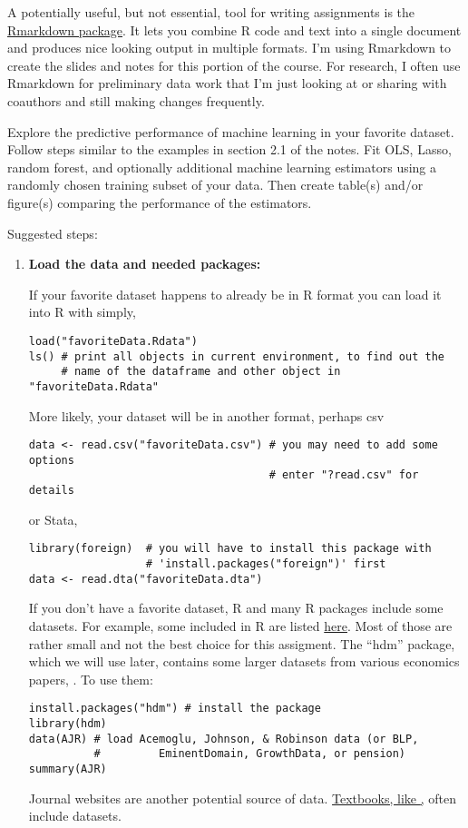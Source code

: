 A potentially useful, but not essential, tool for writing assignments
is the \href{http://rmarkdown.rstudio.com/}{Rmarkdown package}. It
lets you combine R code and text into a single document and produces
nice looking output in multiple formats. I'm using Rmarkdown to create
the slides and notes for this portion of the course. For research, I
often use Rmarkdown for preliminary data work that I'm just looking at
or sharing with coauthors and still making changes frequently.

\begin{problem}
  Explore the predictive performance of machine learning in your
  favorite dataset. Follow steps similar to the examples in section
  2.1 of the notes. Fit OLS, Lasso, random forest, and optionally
  additional machine learning estimators using a randomly chosen
  training subset of your data. Then create table(s) and/or figure(s)
  comparing the performance of the estimators.

  Suggested steps:
  \begin{enumerate}
  \item \textbf{Load the data and needed packages:}
    
    If your favorite dataset happens to already be in R format you can
    load it into R with simply,
\begin{lstlisting}
load("favoriteData.Rdata")
ls() # print all objects in current environment, to find out the 
     # name of the dataframe and other object in "favoriteData.Rdata"
\end{lstlisting}
    More likely, your dataset will be in another format, perhaps csv
\begin{lstlisting}
data <- read.csv("favoriteData.csv") # you may need to add some options
                                     # enter "?read.csv" for details
\end{lstlisting}
    or Stata,
\begin{lstlisting}
library(foreign)  # you will have to install this package with
                  # 'install.packages("foreign")' first
data <- read.dta("favoriteData.dta")
\end{lstlisting}
    If you don't have a favorite dataset, R and many R packages
    include some datasets. For example, some included in R are listed
    \href{https://stat.ethz.ch/R-manual/R-devel/library/datasets/html/00Index.html}{here}. Most
    of those are rather small and not the best choice for this
    assigment. The ``hdm'' package, which we will use later, contains
    some larger datasets from various economics papers,
    \cite{hdm}. To  use them:
\begin{lstlisting}
install.packages("hdm") # install the package
library(hdm)
data(AJR) # load Acemoglu, Johnson, & Robinson data (or BLP, 
          #         EminentDomain, GrowthData, or pension) 
summary(AJR)
\end{lstlisting}
    Journal websites are another potential source of data. 
    \href{https://web.stanford.edu/~hastie/CASI/data.html}{Textbooks,
      like \cite{efron2016},} often include datasets. 
    

\end{enumerate}
\end{problem}
